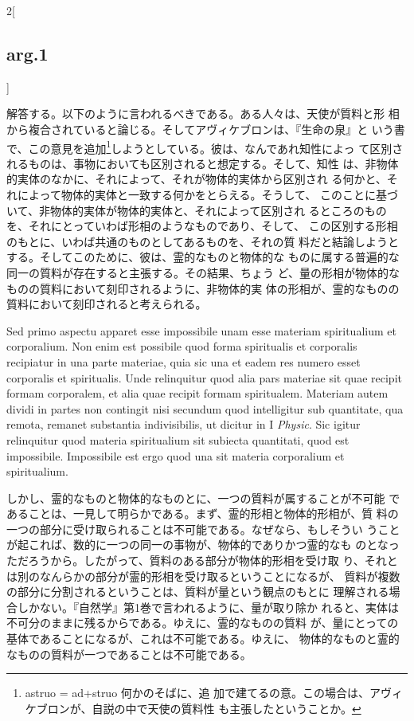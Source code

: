 \documentclass[paper=a4paper,fontsize=10pt,jafontsize=9pt,titlepage]{jlreq}
\begin{document}
\begin{paracol}{2}[\subsection{arg.1}]
\switchcolumn

解答する。以下のように言われるべきである。ある人々は、天使が質料と形
 相から複合されていると論じる。そしてアヴィケブロンは、『生命の泉』と
 いう書で、この意見を追加\footnote{astruo = ad+struo 何かのそばに、追
 加で建てるの意。この場合は、アヴィケブロンが、自説の中で天使の質料性
 も主張したということか。}しようとしている。彼は、なんであれ知性によっ
 て区別されるものは、事物においても区別されると想定する。そして、知性
 は、非物体的実体のなかに、それによって、それが物体的実体から区別され
 る何かと、それによって物体的実体と一致する何かをとらえる。そうして、
 このことに基づいて、非物体的実体が物体的実体と、それによって区別され
 るところのものを、それにとっていわば形相のようなものであり、そして、
 この区別する形相のもとに、いわば共通のものとしてあるものを、それの質
 料だと結論しようとする。そしてこのために、彼は、霊的なものと物体的な
 ものに属する普遍的な同一の質料が存在すると主張する。その結果、ちょう
 ど、量の形相が物体的なものの質料において刻印されるように、非物体的実
 体の形相が、霊的なものの質料において刻印されると考えられる。

\switchcolumn*

Sed primo aspectu apparet esse impossibile unam esse materiam
 spiritualium et corporalium. Non enim est possibile quod forma
 spiritualis et corporalis recipiatur in una parte materiae, quia sic
 una et eadem res numero esset corporalis et spiritualis. Unde
 relinquitur quod alia pars materiae sit quae recipit formam
 corporalem, et alia quae recipit formam spiritualem. Materiam autem
 dividi in partes non contingit nisi secundum quod intelligitur sub
 quantitate, qua remota, remanet substantia indivisibilis, ut dicitur
 in I {\itshape Physic}. Sic igitur relinquitur quod materia
 spiritualium sit subiecta quantitati, quod est
 impossibile. Impossibile est ergo quod una sit materia corporalium et
 spiritualium.

\switchcolumn

しかし、霊的なものと物体的なものとに、一つの質料が属することが不可能
 であることは、一見して明らかである。まず、霊的形相と物体的形相が、質
 料の一つの部分に受け取られることは不可能である。なぜなら、もしそうい
 うことが起これば、数的に一つの同一の事物が、物体的でありかつ霊的なも
 のとなっただろうから。したがって、質料のある部分が物体的形相を受け取
 り、それとは別のなんらかの部分が霊的形相を受け取るということになるが、
 質料が複数の部分に分割されるということは、質料が量という観点のもとに
 理解される場合しかない。『自然学』第1巻で言われるように、量が取り除か
 れると、実体は不可分のままに残るからである。ゆえに、霊的なものの質料
 が、量にとっての基体であることになるが、これは不可能である。ゆえに、
 物体的なものと霊的なものの質料が一つであることは不可能である。


\end{paracol}
\end{document}
